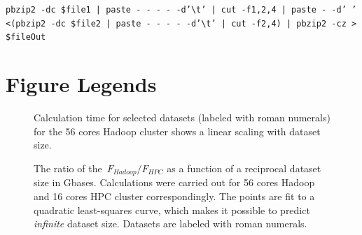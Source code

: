 \documentclass[10pt]{article}
\begin{document}
\texttt {pbzip2 -dc  \${file1} | paste - - - - -d'\textbackslash t' | cut -f1,2,4 | paste - -d' ' <(pbzip2 -dc  \${file2} | paste - - - - -d'\textbackslash t' | cut -f2,4) | pbzip2 -cz > \${fileOut}}






\section*{Figure Legends}

\begin{figure}[!ht]
	
	\caption{Calculation time for selected datasets (labeled with roman numerals) for the 56 cores Hadoop cluster shows a linear scaling with dataset size. }
	\label{fig:fig1}
\end{figure}


\begin{figure}[!ht]
	
	\caption{The ratio of the~$F_{Hadoop}/F_{HPC}$ as a function of a reciprocal dataset size in Gbases. Calculations were carried out for 56 cores Hadoop and 16 cores HPC cluster correspondingly.
The points are fit to a quadratic least-squares curve, which makes it possible to predict {\it infinite} dataset size. Datasets are labeled with roman numerals.}
	\label{fig:fig2}
\end{figure}
\end{document}
